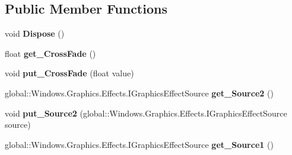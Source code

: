 \subsection*{Public Member Functions}
\begin{DoxyCompactItemize}
\item 
\mbox{\label{class_microsoft_1_1_graphics_1_1_canvas_1_1_effects_1_1_cross_fade_effect_a7e3429fb00e0d8c989d1ee019f8e917d}} 
void {\bfseries Dispose} ()
\item 
\mbox{\label{class_microsoft_1_1_graphics_1_1_canvas_1_1_effects_1_1_cross_fade_effect_a03a1b2e46780db48c746c36e0a0328df}} 
float {\bfseries get\+\_\+\+Cross\+Fade} ()
\item 
\mbox{\label{class_microsoft_1_1_graphics_1_1_canvas_1_1_effects_1_1_cross_fade_effect_a1bb024927d16d9d1077994bdd49ff1b3}} 
void {\bfseries put\+\_\+\+Cross\+Fade} (float value)
\item 
\mbox{\label{class_microsoft_1_1_graphics_1_1_canvas_1_1_effects_1_1_cross_fade_effect_ae64842db8377a81fbe51b6e9c8230622}} 
global\+::\+Windows.\+Graphics.\+Effects.\+I\+Graphics\+Effect\+Source {\bfseries get\+\_\+\+Source2} ()
\item 
\mbox{\label{class_microsoft_1_1_graphics_1_1_canvas_1_1_effects_1_1_cross_fade_effect_a03f909bfef26ae588f520b5c6f561b89}} 
void {\bfseries put\+\_\+\+Source2} (global\+::\+Windows.\+Graphics.\+Effects.\+I\+Graphics\+Effect\+Source source)
\item 
\mbox{\label{class_microsoft_1_1_graphics_1_1_canvas_1_1_effects_1_1_cross_fade_effect_a515cb86c3b146b49a043c5a2f2fa0e34}} 
global\+::\+Windows.\+Graphics.\+Effects.\+I\+Graphics\+Effect\+Source {\bfseries get\+\_\+\+Source1} ()
\item 
\mbox{\label{class_microsoft_1_1_graphics_1_1_canvas_1_1_effects_1_1_cross_fade_effect_a72eb46d22afb55188148751eda6335e6}} 

\end{DoxyCompactItemize}
